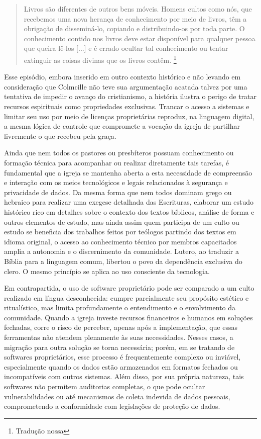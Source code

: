 \begin{quote}
    Livros são diferentes de outros bens móveis. Homens cultos como nós, que recebemos uma nova herança de conhecimento por meio de livros, têm a obrigação de disseminá-lo, copiando e distribuindo-os por toda parte. O conhecimento contido nos livros deve estar disponível para qualquer pessoa que queira lê-los [...] e é errado ocultar tal conhecimento ou tentar extinguir as coisas divinas que os livros contêm. \cite[p.~40-42]{owens_dorean_2021}\footnote{Tradução nossa}
\end{quote}

Esse episódio, embora inserido em outro contexto histórico e não levando em consideração que Colmcille não teve sua argumentação acatada talvez por uma tentativa de impedir o avanço do cristianismo, a história ilustra o perigo de tratar recursos espirituais como propriedades exclusivas. Trancar o acesso a sistemas e limitar seu uso por meio de licenças proprietárias reproduz, na linguagem digital, a mesma lógica de controle que compromete a vocação da igreja de partilhar livremente o que recebeu pela graça.

Ainda que nem todos os pastores ou presbíteros possuam conhecimento ou formação técnica para acompanhar ou realizar diretamente tais tarefas, é fundamental que a igreja se mantenha aberta a esta necessidade de compreensão e interação com os meios tecnológicos e legais relacionados à segurança e privacidade de dados. Da mesma forma que nem todos dominam grego ou hebraico para realizar uma exegese detalhada das Escrituras, elaborar um estudo histórico rico em detalhes sobre o contexto dos textos bíblicos, análise de forma e outros elementos de estudo, mas ainda assim quem participa de um culto ou estudo se beneficia dos trabalhos feitos por teólogos partindo dos textos em idioma original, o acesso ao conhecimento técnico por membros capacitados amplia a autonomia e o discernimento da comunidade. Lutero, ao traduzir a Bíblia para a linguagem comum, libertou o povo da dependência exclusiva do clero. O mesmo princípio se aplica ao uso consciente da tecnologia.

Em contrapartida, o uso de software proprietário pode ser comparado a um culto realizado em língua desconhecida: cumpre parcialmente seu propósito estético e ritualístico, mas limita profundamente o entendimento e o envolvimento da comunidade. Quando a igreja investe recursos financeiros e humanos em soluções fechadas, corre o risco de perceber, apenas após a implementação, que essas ferramentas não atendem plenamente às suas necessidades. Nesses casos, a migração para outra solução se torna necessária; porém, em se tratando de softwares proprietários, esse processo é frequentemente complexo ou inviável, especialmente quando os dados estão armazenados em formatos fechados ou incompatíveis com outros sistemas. Além disso, por sua própria natureza, tais softwares não permitem auditorias completas, o que pode ocultar vulnerabilidades ou até mecanismos de coleta indevida de dados pessoais, comprometendo a conformidade com legislações de proteção de dados.

